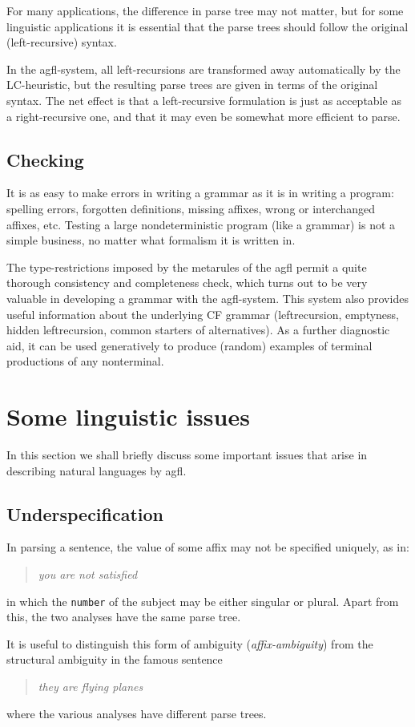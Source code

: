 For many applications, the difference in parse tree may not matter,
but for some linguistic applications it is essential that the parse
trees should follow the original (left-recursive) syntax.

In the {\sc agfl}-system, all left-recursions are transformed away
automatically by the LC-heuristic, but the resulting parse trees
are given in terms of the original syntax. The net effect is that
a left-recursive formulation is just as acceptable as a right-recursive
one, and that it may even be somewhat more efficient to parse.
\subsection{Checking}
It is as easy to make errors in writing a grammar as it is in
writing a program: spelling errors, forgotten definitions, missing affixes,
wrong or interchanged affixes, etc. Testing a large nondeterministic
program (like a grammar) is not a simple business, no matter what
formalism it is written in.

The type-restrictions imposed by the metarules of the {\sc agfl} permit
a quite thorough consistency and completeness check, which turns out
to be very valuable in developing a grammar with the {\sc agfl}-system.
This system also provides useful information about the underlying
CF grammar (leftrecursion, emptyness, hidden leftrecursion, common
starters of alternatives). As a further diagnostic aid, it can
be used generatively to produce (random) examples of terminal
productions of any nonterminal.

\section{Some linguistic issues}
In this section we shall briefly discuss some important issues that arise
in describing natural languages by {\sc agfl}.
\subsection{Underspecification}
In parsing a sentence, the value of some affix may not be specified
uniquely, as in:
\begin{quote}
{\sl you are not satisfied}
\end{quote}
\noindent
in which the {\tt number} of the subject may be either singular or plural.
Apart from this, the two analyses have the same parse tree.

It is useful to distinguish this form of ambiguity ({\em affix-ambiguity})
from the structural ambiguity in the famous sentence
\begin{quote}
{\sl they are flying planes}
\end{quote}
\noindent
where the various analyses have different parse trees.

